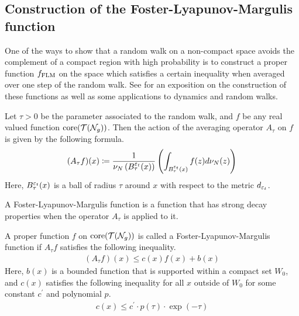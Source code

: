 \subsection{Construction of the Foster-Lyapunov-Margulis function}
\label{sec:constr-marg-funct}

One of the ways to show that a random walk on a non-compact space avoids the complement of a compact region with high probability is to construct a proper function $f_{\mathrm{FLM}}$ on the space which satisfies a certain inequality when averaged over one step of the random walk.
See \textcite{EskinMozes+2022+342+361} for an exposition on the construction of these functions as well as some applications to dynamics and random walks.

\begin{definition}
  Let $\tau > 0$ be the parameter associated to the random walk, and $f$ be any real valued function $\mathrm{core}(\mathcal{T}(\mathcal{N}_g))$.
  Then the action of the averaging operator $A_{\tau}$ on $f$ is given by the following formula.
  \begin{align*}
    (A_{\tau}f)(x) \coloneqq \frac{1}{\nu_N\left( B_{\tau}^{\varepsilon_t}(x) \right)} \left( \int_{B_{\tau}^{\varepsilon_t}(x)} f(z) d\nu_N(z) \right)
  \end{align*}
  Here, $B_{\tau}^{\varepsilon_t}(x)$ is a ball of radius $\tau$ around $x$ with respect to the metric $d_{\varepsilon_t}$.
\end{definition}

A Foster-Lyapunov-Margulis function is a function that has strong decay properties when the operator $A_{\tau}$ is applied to it.

\begin{definition}
  \label{defn:flm}
  A proper function $f$ on $\mathrm{core}(\mathcal{T}(\mathcal{N}_g))$ is called a Foster-Lyapunov-Margulis function if $A_{\tau}f$ satisfies the following inequality.
  \begin{align*}
    (A_{\tau}f)(x) \leq c(x) f(x) + b(x)
  \end{align*}
  Here, $b(x)$ is a bounded function that is supported within a compact set $W_0$, and $c(x)$ satisfies the following inequality for all $x$ outside of $W_0$ for some constant $c^{\prime}$ and polynomial $p$.
  \begin{align*}
    c(x) \leq c^{\prime} \cdot p(\tau) \cdot \exp(-\tau)
  \end{align*}
\end{definition}

